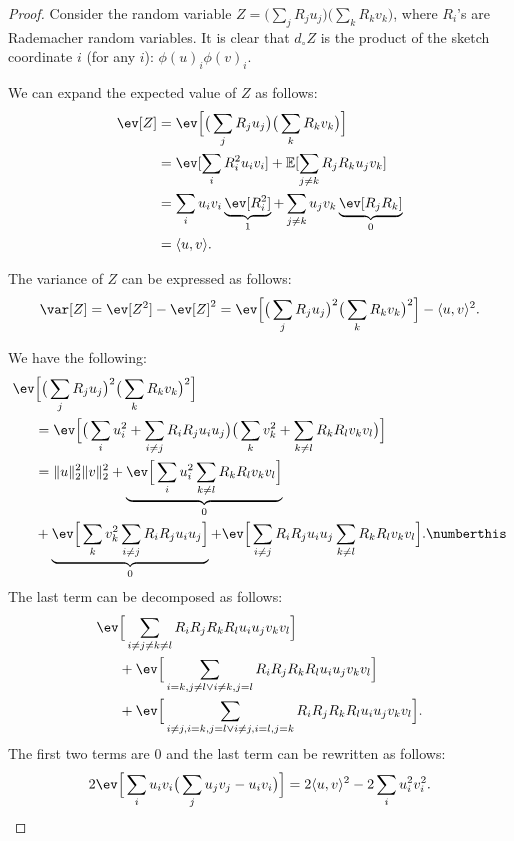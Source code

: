 \begin{proof}
    Consider the random variable $Z=\big( \sum_j R_j u_j \big)\big( \sum_k R_k v_k \big)$,
    where $R_i$'s are Rademacher random variables. It is clear that $d_\circ Z$ is the product
    of the sketch coordinate $i$ (for any $i$): $\phi(u)_i \phi(v)_i$.
    
    We can expand the expected value of $Z$ as follows:
    \begin{align*}
        \ev[Z] &= \ev\Big[ \big( \sum_j R_j u_j \big) \big( \sum_k R_k v_k \big) \Big] \\
        &= \ev[\sum_i R_i^2 u_i v_i] + \mathbb{E}[ \sum_{j \neq k} R_j R_k u_j v_k ] \\
        & = \sum_i u_i v_i \underbrace{\ev[R_i^2]}_1 + \sum_{j \neq k} u_j v_k \underbrace{\ev[R_j R_k ]}_0 \\
        &= \langle u, v \rangle.
    \end{align*}
    
    The variance of $Z$ can be expressed as follows:
    \begin{equation*}
        \var[Z] = \ev[Z^2] - \ev[Z]^2 =
        \ev\Big[\big( \sum_j R_j u_j \big)^2\big( \sum_k R_k v_k \big)^2\Big] - \langle u, v\rangle^2.
    \end{equation*}
    
    We have the following:
    \begin{align*}
        \ev&\Big[\big( \sum_j R_j u_j \big)^2\big( \sum_k R_k v_k \big)^2\Big] \\
        &= \ev\Big[
            \big( \sum_i u_i^2 + \sum_{i \neq j} R_i R_j u_i u_j \big)
            \big( \sum_k v_k^2 + \sum_{k \neq l} R_k R_l v_k v_l \big)
        \Big] \\
            &= \lVert u \rVert_2^2 \lVert v \rVert_2^2 +
                \underbrace{\ev\Big[\sum_i u_i^2 \sum_{k \neq l} R_k R_l v_k v_l\Big]}_0 \\
                &+ \underbrace{\ev\Big[\sum_k v_k^2 \sum_{i \neq j} R_i R_j u_i u_j\Big]}_0 +
                \ev\Big[\sum_{i \neq j} R_i R_j u_i u_j \sum_{k \neq l} R_k R_l v_k v_l\Big]. \numberthis
                \label{equation:sketching:jl-variance-fixed-vectors:variance}
    \end{align*}
    The last term can be decomposed as follows:
    \begin{align*}
        \ev&\Big[ \sum_{i \neq j \neq k \neq l} R_i R_j R_k R_l u_i u_j v_k v_l \Big] \\
        &+\ev\Big[ \sum_{i = k, j \neq l \lor i \neq k, j = l} R_i R_j R_k R_l u_i u_j v_k v_l \Big] \\
        &+ \ev\Big[ \sum_{i \neq j, i=k, j=l \lor i \neq j, i=l, j=k} R_i R_j R_k R_l u_i u_j v_k v_l \Big].
    \end{align*}
    The first two terms are $0$ and the last term can be rewritten as follows:
    \begin{equation}
    \label{equation:sketching:jl-variance-fixed-vectors:reduction}
        2 \ev\Big[ \sum_i u_i v_i \big( \sum_j u_j v_j - u_i v_i \big) \Big] = 2 \langle u, v \rangle^2 - 2 \sum_i u_i^2 v_i^2.
    \end{equation}
    

\end{proof}
